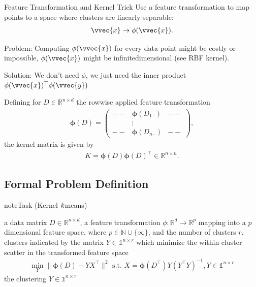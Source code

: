 \documentclass[letterpaper,10pt,english]{jupyterBook}
\begin{document}
\sphinxAtStartPar
Feature Transformation and Kernel Trick
Use a feature transformation to map points to a space where clusters are linearly separable:
\begin{equation*}
\begin{split}\vvec{x}\rightarrow \phi(\vvec{x}).\end{split}
\end{equation*}

\sphinxAtStartPar
Problem: Computing \(\phi(\vvec{x})\) for every data point might be costly or impossible, \(\phi(\vvec{x})\) might be infinite\sphinxhyphen{}dimensional (see RBF kernel).

\sphinxAtStartPar
Solution: We don’t need \(\phi\), we just need the inner product
\(\phi(\vvec{x})^\top\phi(\vvec{y})\)

\sphinxAtStartPar
Defining for \(D\in\mathbb{R}^{n\times d}\) the row\sphinxhyphen{}wise applied feature transformation
\begin{equation*}
\begin{split}{\bm\phi}(D)= \begin{pmatrix}--& {\bm\phi}(D_{1\cdot }) & --\\ &\vdots&\\ --&{\bm\phi}(D_{n\cdot})&--\end{pmatrix},\end{split}
\end{equation*}
the kernel matrix is given by
\begin{equation*}
\begin{split} K = {\bm\phi}(D){\bm\phi}(D)^\top\in\mathbb{R}^{n\times n}.\end{split}
\end{equation*}


\subsection{Formal Problem Definition}
\label{\detokenize{clustering_kernel_kmeans:formal-problem-definition}}
\begin{sphinxadmonition}{note}{Task (Kernel \protect\(k\protect\)\sphinxhyphen{}means)}

\sphinxAtStartPar
{} a data matrix \(D\in\mathbb{R}^{n\times d}\), a feature transformation \(\phi:\mathbb{R}^{d}\rightarrow \mathbb{R}^p\) mapping into a \(p\)\sphinxhyphen{}dimensional feature space, where \(p\in\mathbb{N}\cup\{\infty\}\), and the number of clusters \(r\). clusters indicated by the matrix \(Y\in\mathbb{1}^{n\times r}\) which minimize the within cluster scatter in the transformed feature space
\label{equation:clustering_kernel_kmeans:7c207a1f-29d4-4aff-936c-26bcc616ae41}\begin{align}
\min_{Y} \|{\bm\phi}(D)-YX^\top\|^2 \text{  s.t. } X= {\bm\phi}(D^\top) Y(Y^\top Y)^{-1}, Y\in\mathbb{1}^{n\times r} \label{eq:kernelKMPhi}
\end{align}
\sphinxAtStartPar
{} the clustering \(Y\in\mathbb{1}^{n\times r}\)
\end{sphinxadmonition}
\end{document}
